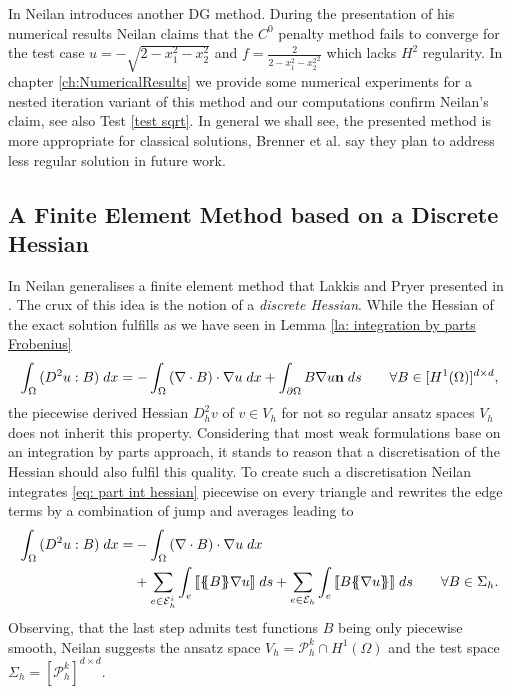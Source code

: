 In \cite{Neilan2014} Neilan introduces another DG method. During the presentation of his numerical results Neilan claims that the $C^0$ penalty method fails to converge for the test case $u = -\sqrt{2 - x_1^2 - x_2^2 }$ and $f = \frac 2 {{2 - x_1^2 - x_2^2}^2}$ which lacks $H^2$ regularity. 
In chapter \ref{ch:NumericalResults} we provide some numerical experiments for a nested iteration variant of this method and our computations confirm Neilan's claim, see also Test \ref{test sqrt}. In general we shall see, the presented method is more appropriate for classical solutions, Brenner et al. say they plan to address less regular solution in future work. 


\subsection{A Finite Element Method based on a Discrete Hessian} \label{subsec: disrete Hessian} \label{sec: FEM discrete Hessian}

In \cite{Neilan2014} Neilan generalises a finite element method that Lakkis and Pryer presented in \cite{LP2011}.
The crux of this idea is the notion of a \emph{discrete Hessian}. 
While the Hessian of the exact solution fulfills as we have seen in Lemma \ref{la: integration by parts Frobenius}
	\begin{align}
		\int_{\Omega} {{ (D^2 u : B)}\;dx} = 
			- \int_{\Omega} {{ \left(\nabla \cdot B\right) \cdot \nabla u}\;dx} 
			+ \int_{\partial \Omega} {{B \nabla u \mathbf {n}}\;ds} \qquad \forall B \in [H^1(\Omega)]^{d \times d}, \label{eq: part int hessian}
	\end{align}
the piecewise derived Hessian $D_h^2 v$ of $ v \in V_h$ for not so regular ansatz spaces $V_h$ does not inherit this property. Considering that most weak formulations base on an integration by parts approach, it stands to reason that a discretisation of the Hessian should also fulfil this quality. To create such a discretisation Neilan integrates \eqref{eq: part int hessian} piecewise on every triangle and rewrites the edge terms by a combination of jump and averages leading to
	\begin{align}
		\begin{split}
		\myIntX  \Omega { (D^2 u : B)}
		=& - \myIntX  \Omega { \left(\nabla \cdot B\right) \cdot \nabla u} \\
			&+ \sum_{ e \in \edgesi} \myIntS e { \jump {\average B \nabla u }}
			+ \sum_{ e \in \edges} \myIntS e {  \jump{B \average {\nabla u} }}  \qquad \forall B \in \Sigma_h. \label{eq: part int hessian omega}
		\end{split}
	\end{align}
Observing, that the last step admits test functions $B$ being only piecewise smooth, Neilan suggests the ansatz space $V_h = \mathcal{P}_h^k \cap H^1(\Omega)$ and the test space $\Sigma_h = [\mathcal{P}_h^k]^{d \times d}$.

